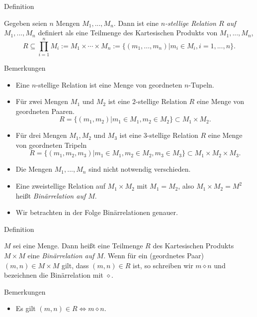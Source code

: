 \documentclass[
  8pt,
  ignorenonframetext,
]{beamer}
\providecommand{\tightlist}{%
  \setlength{\itemsep}{0pt}\setlength{\parskip}{0pt}}
\begin{document}
\begin{frame}{Definition}
\protect\hypertarget{definition-2}{}
\footnotesize
\begin{definition}
\justifying
Gegeben seien $n$ Mengen $M_1,...,M_n$. Dann ist eine \textit{$n$-stellige Relation $R$ auf $M_1,...,M_n$}
definiert als eine Teilmenge des Kartesischen Produkts von $M_1,...,M_n$,
\begin{equation}
R \subseteq \prod_{i=1}^n M_i := M_1 \times \cdots \times M_n := \{(m_1,...,m_n)|m_i \in M_i, i = 1,...,n\}.
\end{equation}
\end{definition}

Bemerkungen

\begin{itemize}
\tightlist
\item
  Eine \(n\)-stellige Relation ist eine Menge von geordneten
  \(n\)-Tupeln.
\item
  Für zwei Mengen \(M_1\) und \(M_2\) ist eine \(2\)-stellige Relation
  \(R\) eine Menge von geordneten Paaren. \begin{equation}
  R = \{(m_1,m_2)|m_1 \in M_1,m_2 \in M_2\} \subset M_1 \times M_2.
  \end{equation}
\item
  Für drei Mengen \(M_1, M_2\) und \(M_3\) ist eine \(3\)-stellige
  Relation \(R\) eine Menge von geordneten Tripeln \begin{equation}
  R = \{(m_1,m_2,m_3)|m_1 \in M_1, m_2 \in M_2, m_3 \in M_3\} \subset M_1 \times M_2 \times M_3.
  \end{equation}
\item
  Die Mengen \(M_1,...,M_n\) sind nicht notwendig verschieden.
\item
  Eine zweistellige Relation auf \(M_1 \times M_2\) mit \(M_1 = M_2\),
  also \(M_1 \times M_2 = M^2\) heißt \textit{Binärrelation auf $M$}.
\item
  Wir betrachten in der Folge Binärrelationen genauer.
\end{itemize}
\end{frame}

\begin{frame}{Definition}
\protect\hypertarget{definition-3}{}
\small
\begin{definition}[Binärrelation]
\justifying
$M$ sei eine Menge. Dann heißt eine Teilmenge $R$ des Kartesischen Produkts $M \times M$
eine \textit{Binärrelation auf $M$}. Wenn für ein (geordnetes Paar) $(m,n) \in M \times M$
gilt, dass $(m,n) \in R$ ist, so schreiben wir $m\diamond n$ und bezeichnen
die Binärrelation mit $\diamond$.
\end{definition}

Bemerkungen

\begin{itemize}
\tightlist
\item
  Es gilt \((m,n) \in R \Leftrightarrow m \diamond n\).
\end{itemize}
\end{frame}
\end{document}

